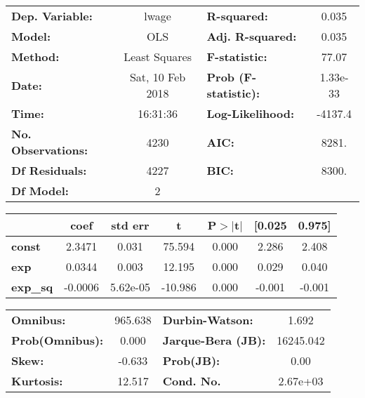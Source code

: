 \begin{center}
\begin{tabular}{lclc}
\toprule
\textbf{Dep. Variable:}    &      lwage       & \textbf{  R-squared:         } &     0.035   \\
\textbf{Model:}            &       OLS        & \textbf{  Adj. R-squared:    } &     0.035   \\
\textbf{Method:}           &  Least Squares   & \textbf{  F-statistic:       } &     77.07   \\
\textbf{Date:}             & Sat, 10 Feb 2018 & \textbf{  Prob (F-statistic):} &  1.33e-33   \\
\textbf{Time:}             &     16:31:36     & \textbf{  Log-Likelihood:    } &   -4137.4   \\
\textbf{No. Observations:} &        4230      & \textbf{  AIC:               } &     8281.   \\
\textbf{Df Residuals:}     &        4227      & \textbf{  BIC:               } &     8300.   \\
\textbf{Df Model:}         &           2      & \textbf{                     } &             \\
\bottomrule
\end{tabular}
\begin{tabular}{lcccccc}
                 & \textbf{coef} & \textbf{std err} & \textbf{t} & \textbf{P$>$$|$t$|$} & \textbf{[0.025} & \textbf{0.975]}  \\
\midrule
\textbf{const}   &       2.3471  &        0.031     &    75.594  &         0.000        &        2.286    &        2.408     \\
\textbf{exp}     &       0.0344  &        0.003     &    12.195  &         0.000        &        0.029    &        0.040     \\
\textbf{exp\_sq} &      -0.0006  &     5.62e-05     &   -10.986  &         0.000        &       -0.001    &       -0.001     \\
\bottomrule
\end{tabular}
\begin{tabular}{lclc}
\textbf{Omnibus:}       & 965.638 & \textbf{  Durbin-Watson:     } &     1.692  \\
\textbf{Prob(Omnibus):} &   0.000 & \textbf{  Jarque-Bera (JB):  } & 16245.042  \\
\textbf{Skew:}          &  -0.633 & \textbf{  Prob(JB):          } &      0.00  \\
\textbf{Kurtosis:}      &  12.517 & \textbf{  Cond. No.          } &  2.67e+03  \\
\bottomrule
\end{tabular}
\end{center}